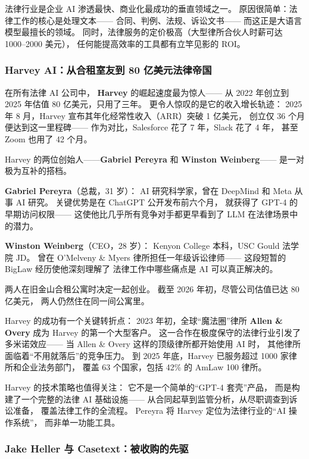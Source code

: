 法律行业是企业 AI 渗透最快、商业化最成功的垂直领域之一。
原因很简单：法律工作的核心是处理文本——
合同、判例、法规、诉讼文书——
而这正是大语言模型最擅长的领域。
同时，法律服务的定价极高（大型律所合伙人时薪可达 1000--2000 美元），
任何能提高效率的工具都有立竿见影的 ROI。

\subsubsection{Harvey AI：从合租室友到 80 亿美元法律帝国}

在所有法律 AI 公司中，
\textbf{Harvey} 的崛起速度最为惊人——
从 2022 年创立到 2025 年估值 80 亿美元，只用了三年。
更令人惊叹的是它的收入增长轨迹：
2025 年 8 月，Harvey 宣布其年化经常性收入（ARR）突破 1 亿美元，
创立仅 36 个月便达到这一里程碑——
作为对比，Salesforce 花了 7 年，Slack 花了 4 年，
甚至 Zoom 也用了 42 个月。

Harvey 的两位创始人——\textbf{Gabriel Pereyra} 和 \textbf{Winston Weinberg}——
是一对极为互补的搭档。

\begin{corebox}
\textbf{Gabriel Pereyra}（总裁，31 岁）：
AI 研究科学家，曾在 DeepMind 和 Meta 从事 AI 研究。
关键优势是在 ChatGPT 公开发布前六个月，
就获得了 GPT-4 的早期访问权限——
这使他比几乎所有竞争对手都更早看到了 LLM 在法律场景中的潜力。

\textbf{Winston Weinberg}（CEO，28 岁）：
Kenyon College 本科，USC Gould 法学院 JD。
曾在 O'Melveny \& Myers 律所担任一年级诉讼律师——
这段短暂的 BigLaw 经历使他深刻理解了
法律工作中哪些痛点是 AI 可以真正解决的。

两人在旧金山合租公寓时决定一起创业。
截至 2026 年初，尽管公司估值已达 80 亿美元，
两人仍然住在同一间公寓里。
\end{corebox}

Harvey 的成功有一个关键转折点：
2023 年初，全球``魔法圈''律所 \textbf{Allen \& Overy}
成为 Harvey 的第一个大型客户。
这一合作在极度保守的法律行业引发了多米诺效应——
当 Allen \& Overy 这样的顶级律所都开始使用 AI 时，
其他律所面临着``不用就落后''的竞争压力。
到 2025 年底，Harvey 已服务超过 1000 家律所和企业法务部门，
覆盖 63 个国家，包括 42\% 的 AmLaw 100 律所。

Harvey 的技术策略也值得关注：
它不是一个简单的``GPT-4 套壳''产品，
而是构建了一个完整的法律 AI 基础设施——
从合同起草到监管分析，从尽职调查到诉讼准备，
覆盖法律工作的全流程。
Pereyra 将 Harvey 定位为法律行业的``AI 操作系统''，
而非单一功能工具。

\subsubsection{Jake Heller 与 Casetext：被收购的先驱}


